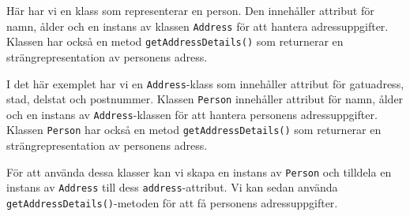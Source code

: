 Här har vi en klass som representerar en person. Den innehåller attribut
för namn, ålder och en instans av klassen \texttt{Address} för att
hantera adressuppgifter. Klassen har också en metod
\texttt{getAddressDetails()} som returnerar en strängrepresentation av
personens adress.

\hypertarget{cb3}{}
\begin{Shaded}
\begin{Highlighting}[]
\OperatorTok{=}  \OperatorTok{(}\OperatorTok{,} \OperatorTok{,} \OperatorTok{,} \OperatorTok{);}
\OperatorTok{=}  \OperatorTok{(}\OperatorTok{,} \OperatorTok{,}\OperatorTok{);}
\OperatorTok{(}\OperatorTok{());}
\end{Highlighting}
\end{Shaded}

I det här exemplet har vi en \texttt{Address}-klass som innehåller
attribut för gatuadress, stad, delstat och postnummer. Klassen
\texttt{Person} innehåller attribut för namn, ålder och en instans av
\texttt{Address}-klassen för att hantera personens adressuppgifter.
Klassen \texttt{Person} har också en metod \texttt{getAddressDetails()}
som returnerar en strängrepresentation av personens adress.

För att använda dessa klasser kan vi skapa en instans av \texttt{Person}
och tilldela en instans av \texttt{Address} till dess
\texttt{address}-attribut. Vi kan sedan använda
\texttt{getAddressDetails()}-metoden för att få personens
adressuppgifter.

\hypertarget{cb4}{}
\begin{Shaded}
\begin{Highlighting}[]
\OperatorTok{=}  \OperatorTok{(}\OperatorTok{,} \OperatorTok{,} \OperatorTok{,} \OperatorTok{);}
\OperatorTok{=}  \OperatorTok{(}\OperatorTok{,} \OperatorTok{,}\OperatorTok{);}
\OperatorTok{(}\OperatorTok{());}
\end{Highlighting}
\end{Shaded}

